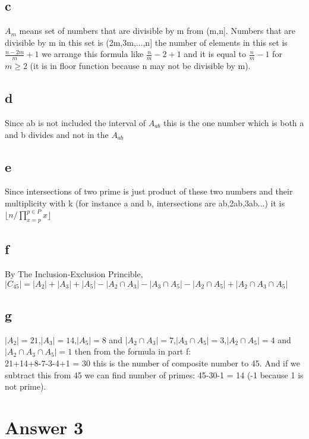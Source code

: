 \documentclass[12pt]{article}
\begin{document}
\subsection*{c}
$A_m$  means set of numbers that are divisible by m from (m,n]. Numbers that are divisible by m in this set is (2m,3m,...,n] the number of elements in this set is $\frac{n-2m}{m}+1$ we arrange this formula like $\frac{n}{m} -2 +1$ and it is equal to $\frac{n}{m}-1$ for $m \geq 2$ (it is in floor function because n may not be divisible by m). 
\subsection*{d}
Since ab is not included the interval of $A_{ab}$ this is the one number which is both a and b divides and not in the $A_{ab}$
\subsection*{e}
Since intersections of two prime is just product of these two numbers and their multiplicity with k (for instance a and b, intersections are ab,2ab,3ab...) it is $\lfloor n/ \prod_{x=p}^{p\in P} x \rfloor $
\subsection*{f}
By The Inclusion-Exclusion Princible, \\
$|C_{45}|=|A_2|+|A_3|+|A_5|-|A_2\cap A_3|-|A_3\cap A_5|-|A_2\cap A_5| + |A_2 \cap A_3 \cap A_5|$
\subsection*{g}
$|A_2| = 21$,$|A_3| = 14$,$|A_5| = 8$ and $|A_2\cap A_3| = 7$,$|A_3\cap A_5|=3$,$|A_2\cap A_5|=4$ and $|A_2 \cap A_3 \cap A_5| = 1$ then from the formula in part f: \\
21+14+8-7-3-4+1 = 30 this is the number of composite number to 45. And if we subtract this from 45 we can find number of primes: 45-30-1 = 14 (-1 because 1 is not prime).
\section*{Answer 3}
\end{document}
